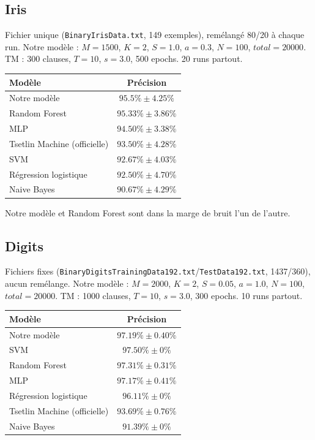 \documentclass[12pt,a4paper]{article}
\begin{document}
\subsection{Iris}
Fichier unique (\texttt{BinaryIrisData.txt}, 149 exemples), remélangé 80/20 à
chaque run. Notre modèle : $M{=}1500$, $K{=}2$, $S{=}1.0$, $a{=}0.3$,
$N{=}100$, $total{=}20000$. TM : 300 clauses, $T{=}10$, $s{=}3.0$, 500 epochs.
20 runs partout.
\begin{center}
\begin{tabular}{lc}
\toprule
Modèle & Précision \\
\midrule
Notre modèle & $\mathbf{95.5\%\pm4.25\%}$ \\
Random Forest & $95.33\%\pm3.86\%$ \\
MLP & $94.50\%\pm3.38\%$ \\
Tsetlin Machine (officielle) & $93.50\%\pm4.28\%$ \\
SVM & $92.67\%\pm4.03\%$ \\
Régression logistique & $92.50\%\pm4.70\%$ \\
Naive Bayes & $90.67\%\pm4.29\%$ \\
\bottomrule
\end{tabular}
\end{center}
Notre modèle et Random Forest sont dans la marge de bruit l'un de l'autre.

\subsection{Digits}
Fichiers fixes (\texttt{BinaryDigitsTrainingData192.txt}/\texttt{TestData192.txt},
1437/360), aucun remélange. Notre modèle : $M{=}2000$, $K{=}2$, $S{=}0.05$,
$a{=}1.0$, $N{=}100$, $total{=}20000$. TM : 1000 clauses, $T{=}10$, $s{=}3.0$,
300 epochs. 10 runs partout.
\begin{center}
\begin{tabular}{lc}
\toprule
Modèle & Précision \\
\midrule
Notre modèle & $\mathbf{97.19\%\pm0.40\%}$ \\
SVM & $97.50\%\pm0\%$ \\
Random Forest & $97.31\%\pm0.31\%$ \\
MLP & $97.17\%\pm0.41\%$ \\
Régression logistique & $96.11\%\pm0\%$ \\
Tsetlin Machine (officielle) & $93.69\%\pm0.76\%$ \\
Naive Bayes & $91.39\%\pm0\%$ \\
\bottomrule
\end{tabular}
\end{center}
\end{document}
